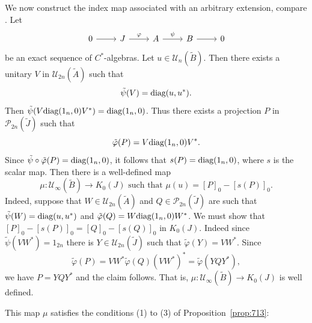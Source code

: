 \documentclass{book}
\def\cstars{\(C^*\)-algebras}
\def\diag{\textnormal{diag}}
\begin{document}
We now construct the index map associated with an arbitrary extension, compare
\cite[Sections~9.1--9.3]{RordamLarsenLaustsen2000}.
Let 
\[
  \begin{tikzcd}
    0\arrow[r] &J \arrow[r, "\varphi"]& A \arrow[r, "\psi"]&B\arrow[r]& 0
    \end{tikzcd} 
\]
  be an exact sequence of \cstars. Let \(u\in\mathcal{U}_n(\tilde{B})\).
Then there exists a unitary \(V\) in \(\mathcal{U}_{2n}(\tilde{A})\) such that
\begin{equation}\label{eq:727}
  \tilde{\psi}(V)=\diag(u,u^*).
\end{equation}
Then \(\tilde{\psi}(V\diag(1_n,0)V^*)=\diag(1_n,0)\). Thus there exists a projection \(P\) in \(\mathcal{P}_{2n}(\tilde{J})\) such that
\begin{equation}\label{eq:728}
  \tilde{\varphi}(P)=V\diag(1_n,0)V^*.
\end{equation}
Since \(\tilde{\psi}\circ\tilde{\varphi}(P)=\diag(1_n,0)\), it follows that \(s(P)=\diag(1_n,0)\), where \(s\) is the scalar map.
Then there is a well-defined map 
\[
  \mu:\mathcal{U}_\infty(\tilde{B})\rightarrow K_0(J)\text{ such that }\mu(u)={[P]}_0-{[s(P)]}_0.
\]
Indeed, suppose that \(W\in\mathcal{U}_{2n}(\tilde{A})\) and \(Q\in\mathcal{P}_{2n}(\tilde{J})\) are such that \(\tilde{\psi}(W)=\diag(u,u^*)\)
and \(\tilde{\varphi}(Q)=W\diag(1_n,0)W^*\). We must show that \({[P]}_0-{[s(P)]}_0={[Q]}_0-{[s(Q)]}_0\) in \(K_0(J)\).
  Indeed since \(\tilde{\psi}(VW^*)=1_{2n}\) there is \(Y\in\mathcal{U}_{2n}(\tilde{J})\) such that \(\tilde{\varphi}(Y)=VW^*\). Since
\[
  \tilde{\varphi}(P)=VW^*\tilde{\varphi}(Q){(VW^*)}^*=\tilde{\varphi}(YQY^*),
\]
we have \(P=YQY^*\) and the claim follows. That is, \(\mu:\mathcal{U}_\infty(\tilde{B})\rightarrow K_0(J)\) is well defined.\par
This map \(\mu\) satisfies the conditions (1) to (3) of Proposition~\ref{prop:713}:
\end{document}
